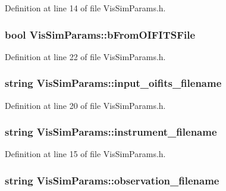 Definition at line 14 of file VisSimParams.h.

\hypertarget{classVisSimParams_ae8c4c4e95792ee06a4198b39516e03fb}{
\subsubsection[{bFromOIFITSFile}]{\setlength{\rightskip}{0pt plus 5cm}bool {\bf VisSimParams::bFromOIFITSFile}}}
\label{classVisSimParams_ae8c4c4e95792ee06a4198b39516e03fb}


Definition at line 22 of file VisSimParams.h.

\hypertarget{classVisSimParams_ad590ce822859b9f7b777e30c708872ff}{
\subsubsection[{input\_\-oifits\_\-filename}]{\setlength{\rightskip}{0pt plus 5cm}string {\bf VisSimParams::input\_\-oifits\_\-filename}}}
\label{classVisSimParams_ad590ce822859b9f7b777e30c708872ff}


Definition at line 20 of file VisSimParams.h.

\hypertarget{classVisSimParams_a1b39663100b7215fc5d8f61d30d85044}{
\subsubsection[{instrument\_\-filename}]{\setlength{\rightskip}{0pt plus 5cm}string {\bf VisSimParams::instrument\_\-filename}}}
\label{classVisSimParams_a1b39663100b7215fc5d8f61d30d85044}


Definition at line 15 of file VisSimParams.h.

\hypertarget{classVisSimParams_af264c40e20632cfc50ebf48825cb5da8}{
\subsubsection[{observation\_\-filename}]{\setlength{\rightskip}{0pt plus 5cm}string {\bf VisSimParams::observation\_\-filename}}}
\label{classVisSimParams_af264c40e20632cfc50ebf48825cb5da8}


